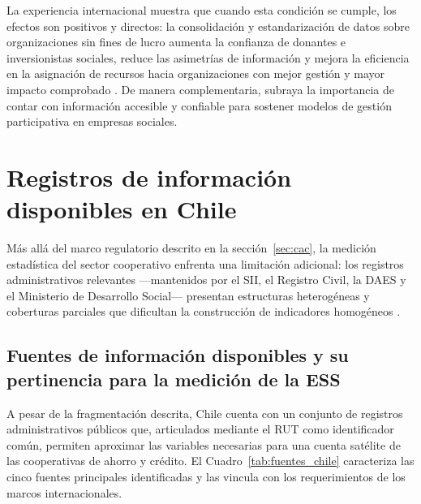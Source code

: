 La experiencia internacional muestra que cuando esta condición se cumple, 
los efectos son positivos y directos: la consolidación y estandarización de 
datos sobre organizaciones sin fines de lucro aumenta la confianza de 
donantes e inversionistas sociales, reduce las asimetrías de información y 
mejora la eficiencia en la asignación de recursos hacia organizaciones con 
mejor gestión y mayor impacto comprobado \cite{uzea_challenges_2015}. De 
manera complementaria,  subraya la importancia 
de contar con información accesible y confiable para sostener modelos de 
gestión participativa en empresas sociales.


\section{Registros de información disponibles en Chile}
\label{sec:institucionalidad}
Más allá del marco regulatorio descrito en la sección~\ref{sec:cac}, la medición 
estadística del sector cooperativo enfrenta una limitación adicional: los registros 
administrativos relevantes ---mantenidos por el SII, el Registro Civil, la DAES y 
el Ministerio de Desarrollo Social--- presentan estructuras heterogéneas y coberturas 
parciales que dificultan la construcción de indicadores homogéneos 
.

\subsection{Fuentes de información disponibles y su pertinencia para la medición de la ESS}
A pesar de la fragmentación descrita, Chile cuenta con un conjunto de registros
administrativos públicos que, articulados mediante el RUT como identificador común,
permiten aproximar las variables necesarias para una cuenta satélite de las
cooperativas de ahorro y crédito. El Cuadro~\ref{tab:fuentes_chile} caracteriza las
cinco fuentes principales identificadas y las vincula con los requerimientos de los
marcos internacionales.

